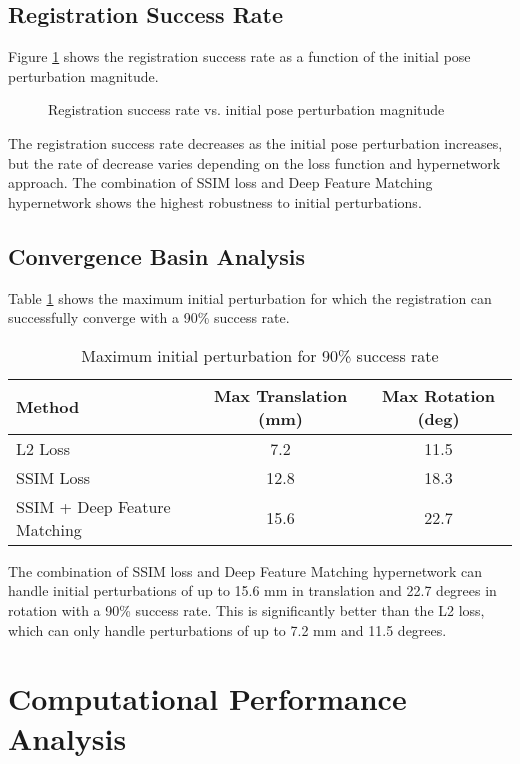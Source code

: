 \subsection{Registration Success Rate}
Figure \ref{fig:pose_sensitivity} shows the registration success rate as a function of the initial pose perturbation magnitude.

\begin{figure}[h]
\centering
\caption{Registration success rate vs. initial pose perturbation magnitude}
\label{fig:pose_sensitivity}
\end{figure}

The registration success rate decreases as the initial pose perturbation increases, but the rate of decrease varies depending on the loss function and hypernetwork approach. The combination of SSIM loss and Deep Feature Matching hypernetwork shows the highest robustness to initial perturbations.

\subsection{Convergence Basin Analysis}
Table \ref{tab:convergence_basin} shows the maximum initial perturbation for which the registration can successfully converge with a 90\% success rate.

\begin{table}[h]
\centering
\caption{Maximum initial perturbation for 90\% success rate}
\label{tab:convergence_basin}
\begin{tabular}{lcc}
\toprule
\textbf{Method} & \textbf{Max Translation (mm)} & \textbf{Max Rotation (deg)} \\
\midrule
L2 Loss & 7.2 & 11.5 \\
SSIM Loss & 12.8 & 18.3 \\
SSIM + Deep Feature Matching & 15.6 & 22.7 \\
\bottomrule
\end{tabular}
\end{table}

The combination of SSIM loss and Deep Feature Matching hypernetwork can handle initial perturbations of up to 15.6 mm in translation and 22.7 degrees in rotation with a 90\% success rate. This is significantly better than the L2 loss, which can only handle perturbations of up to 7.2 mm and 11.5 degrees.

\section{Computational Performance Analysis}

